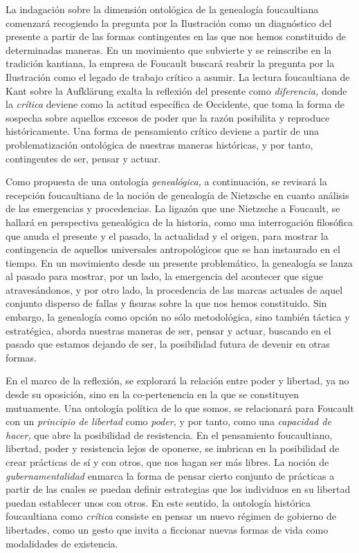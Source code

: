 \documentclass{book}
\begin{document}
La indagación sobre la dimensión ontológica de la genealogía
foucaultiana comenzará recogiendo la pregunta por la Ilustración como un
diagnóstico del presente a partir de las formas contingentes en las que
nos hemos constituido de determinadas maneras. En un movimiento que
subvierte y se reinscribe en la tradición kantiana, la empresa de
Foucault buscará reabrir la pregunta por la Ilustración como el legado
de trabajo crítico a asumir. La lectura foucaultiana de Kant sobre la
Aufklärung exalta la reflexión del presente como \emph{diferencia,}
donde la \emph{crítica} deviene como la actitud específica de Occidente,
que toma la forma de sospecha sobre aquellos excesos de poder que la
razón posibilita y reproduce históricamente. Una forma de pensamiento
crítico deviene a partir de una problematización ontológica de nuestras
maneras históricas, y por tanto, contingentes de ser, pensar y actuar.

Como propuesta de una ontología \emph{genealógica,} a continuación, se
revisará la recepción foucaultiana de la noción de genealogía de
Nietzsche en cuanto análisis de las emergencias y procedencias. La
ligazón que une Nietzsche a Foucault, se hallará en perspectiva
genealógica de la historia, como una interrogación filosófica que anuda
el presente y el pasado, la actualidad y el origen, para mostrar la
contingencia de aquellos universales antropológicos que se han
instaurado en el tiempo. En un movimiento desde un presente
problemático, la genealogía se lanza al pasado para mostrar, por un
lado, la emergencia del acontecer que sigue atravesándonos, y por otro
lado, la procedencia de las marcas actuales de aquel conjunto disperso
de fallas y fisuras sobre la que nos hemos constituido. Sin embargo, la
genealogía como opción no sólo metodológica, sino también táctica y
estratégica, aborda nuestras maneras de ser, pensar y actuar, buscando
en el pasado que estamos dejando de ser, la posibilidad futura de
devenir en otras formas.

En el marco de la reflexión, se explorará la relación entre poder y
libertad, ya no desde su oposición, sino en la co-pertenencia en la que
se constituyen mutuamente. Una ontología política de lo que somos, se
relacionará para Foucault con un \emph{principio de libertad} como
\emph{poder,} y por tanto, como una \emph{capacidad de hacer,} que abre
la posibilidad de resistencia. En el pensamiento foucaultiano, libertad,
poder y resistencia lejos de oponerse, se imbrican en la posibilidad de
crear prácticas de sí y con otros, que nos hagan ser más libres. La
noción de \emph{gubernamentalidad} enmarca la forma de pensar cierto
conjunto de prácticas a partir de las cuales se puedan definir
estrategias que los individuos en su libertad puedan establecer unos con
otros. En este sentido, la ontología histórica foucaultiana como
\emph{crítica} consiste en pensar un nuevo régimen de gobierno de
libertades, como un gesto que invita a ficcionar nuevas formas de vida
como modalidades de existencia.
\end{document}
